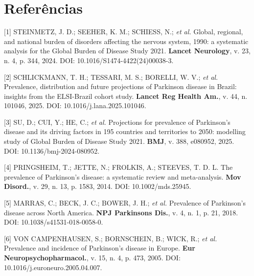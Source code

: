 \documentclass[12pt,a4paper,oneside]{article}
\begin{document}
\section*{Referências}\label{sec:ref}
\begin{singlespace}\small

\noindent\hangindent=1.25cm\label{ref:gbd}
[1] STEINMETZ, J. D.; SEEHER, K. M.; SCHIESS, N.; \textit{et al.}
Global, regional, and national burden of disorders affecting the
nervous system, 1990: a systematic analysis for the
Global Burden of Disease Study 2021. \textbf{Lancet Neurology}, v.
23, n. 4, p. 344, 2024. DOI: 10.1016/S1474-4422(24)00038-3.
\par\smallskip

\noindent\hangindent=1.25cm\label{ref:elsi}
[2] SCHLICKMANN, T. H.; TESSARI, M. S.; BORELLI, W. V.; \textit{et al.}
Prevalence, distribution and future projections of Parkinson disease
in Brazil: insights from the ELSI-Brazil cohort study.
\textbf{Lancet Reg Health Am.}, v. 44, n. 101046, 2025. DOI:
10.1016/j.lana.2025.101046.\par\smallskip

\noindent\hangindent=1.25cm\label{ref:su}
[3] SU, D.; CUI, Y.; HE, C.; \textit{et al.} Projections for
prevalence of Parkinson's disease and its driving factors in 195
countries and territories to 2050: modelling study of Global Burden
of Disease Study 2021. \textbf{BMJ}, v. 388, e080952, 2025. DOI:
10.1136/bmj-2024-080952.\par\smallskip

\noindent\hangindent=1.25cm\label{ref:pringsheim}
[4] PRINGSHEIM, T.; JETTE, N.; FROLKIS, A.; STEEVES, T. D. L. The
prevalence of Parkinson's disease: a systematic review and
meta-analysis. \textbf{Mov Disord.}, v. 29, n. 13,
p. 1583, 2014. DOI: 10.1002/mds.25945.\par\smallskip

\noindent\hangindent=1.25cm\label{ref:marras}
[5] MARRAS, C.; BECK, J. C.; BOWER, J. H.; \textit{et al.}
Prevalence of Parkinson's disease across North America. \textbf{NPJ
Parkinsons Dis.}, v. 4, n. 1, p. 21, 2018. DOI:
10.1038/s41531-018-0058-0.\par\smallskip

\noindent\hangindent=1.25cm\label{ref:vonCampenhausen}
[6] VON CAMPENHAUSEN, S.; BORNSCHEIN, B.; WICK, R.; \textit{et al.}
Prevalence and incidence of Parkinson's disease in Europe.
\textbf{Eur Neuropsychopharmacol.}, v. 15, n. 4,
p. 473, 2005. DOI:
10.1016/j.euroneuro.2005.04.007.\par\smallskip


\end{singlespace}
\end{document}

